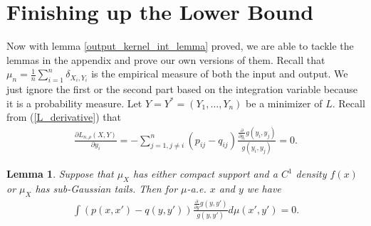 \documentclass[10pt]{article}
\newtheorem{lemma}{\bf Lemma}
\newenvironment{Proof of lemma}{\noindent{\bf Proof of Lemma}}{\hfill$\Box$\newline}
\newenvironment{Proof of claim}{\noindent{\bf Proof of claim}}{\hfill$\Box$\newline}
\newenvironment{Proof of theorem}{\noindent{\bf Proof of Theorem}}{\hfill\scriptsize{$\Box$}\newline}
\newenvironment{Proof of theorems}{\noindent{\bf Proof of Theorems}}{\hfill$\Box$\newline}
\newenvironment{Proof of proposition}{\noindent{\bf Proof of Proposition}}{\hfill$\Box$\newline}
\newenvironment{Proof of propositions}{\noindent{\bf Proof of Propositions}}{\hfill$\Box$\newline}
\newenvironment{Proof of exercise}{\noindent{\it Proof of Exercise:}}{\hfill$\Box$}
\numberwithin{equation}{section}
\begin{document}
\section{Finishing up the Lower Bound}
Now with lemma \ref{output_kernel_int_lemma} proved, we are able to tackle the
lemmas in the appendix and prove our own versions of them. Recall that $\mu_n =
    \frac{1}{n}\sum_{i=1}^n \delta_{X_i,Y_i}$ is the empirical measure of both the
input and output. We just ignore the first or the second part based on the
integration variable because it is a probability measure. Let $Y = Y^* =
    (Y_1,\dots,Y_n)$ be a minimizer of $L$. Recall from (\ref{L_derivative}) that
\begin{align}
    \frac{\partial L_{n, \rho}(X,Y)}{\partial y_i} = -\sum_{j=1, j \neq i}^n (p_{ij}-q_{ij}) \frac{\frac{\partial}{\partial y_i}g(y_i,y_j)}{g(y_i,y_j)} = 0.
\end{align}
\begin{lemma} \label{appendix_lemma}
    Suppose that $\mu_X$ has either compact support and a $C^1$ density $f(x)$ or $\mu_X$ has sub-Gaussian tails. Then for $\mu$-a.e. $x$ and $y$ we have
    \begin{align}
        \int (p(x,x')-q(y,y')) \frac{\frac{\partial}{\partial y}g(y,y')}{g(y,y')} d\mu(x',y') = 0.
    \end{align}
\end{lemma}
\end{document}
